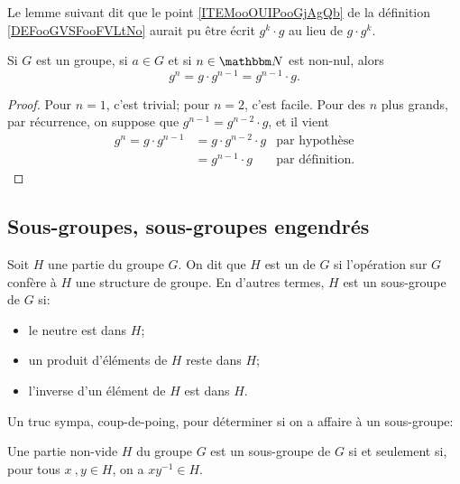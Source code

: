 Le lemme suivant dit que le point \ref{ITEMooOUIPooGjAgQb} de la définition \ref{DEFooGVSFooFVLtNo} aurait pu être écrit \( g^k\cdot g\) au lieu de \( g\cdot g^k\).
\begin{lemma}        \label{LEMooWPARooYLZlzr}
    Si \( G\) est un groupe, si \( a\in G \) et si \( n\in \eN\) est non-nul, alors
    \begin{equation}
        g^n=g\cdot g^{n-1}=g^{n-1}\cdot g.
    \end{equation}
\end{lemma}
\begin{proof}
Pour \( n = 1 \), c'est trivial; pour \( n = 2 \), c'est facile. Pour des \( n \) plus grands, par récurrence, on suppose que \( g^{n-1} = g^{n-2}\cdot g \), et il vient 
\begin{align}
 g^n = g\cdot g^{n-1} &= g\cdot  g^{n-2}\cdot g  &\text{par hypothèse}\\
 & = g^{n-1}\cdot g &\text{par définition}.
 \end{align}
\end{proof}

\subsection{Sous-groupes, sous-groupes engendrés}

\begin{definition}
    Soit \( H\) une partie du groupe \( G\). On dit que \( H \) est un  de \( G \) si l'opération sur \( G\) confère à \( H\) une structure de groupe. En d'autres termes, \( H \) est un sous-groupe de \( G \) si:
\begin{itemize}
    \item le neutre est dans \( H\);
    \item un produit d'éléments de \( H\) reste dans \( H\);
    \item l'inverse d'un élément de \( H\) est dans \( H\).
\end{itemize}
\end{definition}

Un truc sympa, coup-de-poing, pour déterminer si on a affaire à un sous-groupe:

\begin{proposition}    \label{PROP_criteressgroupe}
Une partie non-vide \( H\) du groupe \( G\) est un sous-groupe de \( G \) si et seulement si, pour tous \(x\ ,y \in H\), on a \( xy^{-1} \in H\).
\end{proposition}

